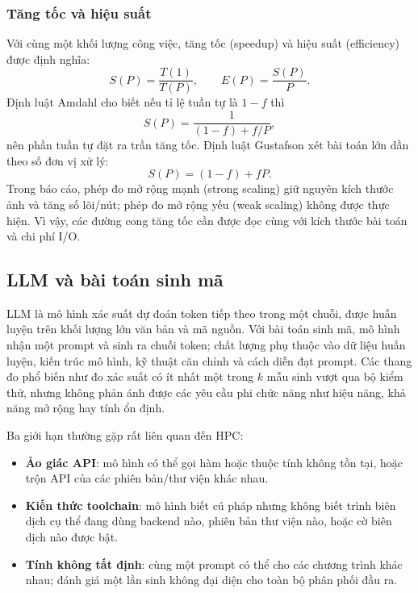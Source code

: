 \subsubsection{Tăng tốc và hiệu suất}

Với cùng một khối lượng công việc, tăng tốc (speedup) và hiệu suất (efficiency)
được định nghĩa:
\begin{equation}
  S(P) = \frac{T(1)}{T(P)}, \qquad
  E(P) = \frac{S(P)}{P}.
  \label{eq:speedup}
\end{equation}
Định luật Amdahl cho biết nếu tỉ lệ tuần tự là $1-f$ thì
\begin{equation}
  S(P) = \frac{1}{(1-f) + f/P},
  \label{eq:amdahl}
\end{equation}
nên phần tuần tự đặt ra trần tăng tốc. Định luật Gustafson xét bài toán lớn dần
theo số đơn vị xử lý:
\begin{equation}
  S(P) = (1-f) + fP.
  \label{eq:gustafson}
\end{equation}
Trong báo cáo, phép đo mở rộng mạnh (strong scaling) giữ nguyên kích thước ảnh và
tăng số lõi/nút; phép đo mở rộng yếu (weak scaling) không được thực hiện. Vì vậy,
các đường cong tăng tốc cần được đọc cùng với kích thước bài toán và chi phí I/O.

\subsection{LLM và bài toán sinh mã}

LLM là mô hình xác suất dự đoán token tiếp theo trong một chuỗi, được huấn luyện
trên khối lượng lớn văn bản và mã nguồn. Với bài toán sinh mã, mô hình nhận một
prompt và sinh ra chuỗi token; chất lượng phụ thuộc vào dữ liệu huấn luyện, kiến
trúc mô hình, kỹ thuật căn chỉnh và cách diễn đạt prompt. Các thang đo phổ biến
như  đo xác suất có ít nhất một trong $k$ mẫu sinh vượt qua bộ kiểm
thử, nhưng không phản ánh được các yêu cầu phi chức năng như hiệu năng, khả năng
mở rộng hay tính ổn định.

Ba giới hạn thường gặp rất liên quan đến HPC:

\begin{itemize}
  \item \textbf{Ảo giác API}: mô hình có thể gọi hàm hoặc thuộc tính không tồn tại,
        hoặc trộn API của các phiên bản/thư viện khác nhau.
  \item \textbf{Kiến thức toolchain}: mô hình biết cú pháp nhưng không biết trình
        biên dịch cụ thể đang dùng backend nào, phiên bản thư viện nào, hoặc cờ
        biên dịch nào được bật.
  \item \textbf{Tính không tất định}: cùng một prompt có thể cho các chương trình
        khác nhau; đánh giá một lần sinh không đại diện cho toàn bộ phân phối đầu
        ra.
\end{itemize}

